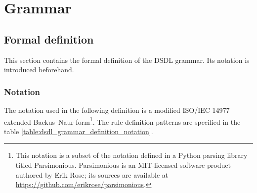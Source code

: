 \section{Grammar}

\subsection{Formal definition}

This section contains the formal definition of the DSDL grammar.
Its notation is introduced beforehand.

\subsubsection{Notation}

The notation used in the following definition is a modified ISO/IEC 14977 extended Backus--Naur
form\footnote{This notation is a subset of the notation defined in a Python parsing library titled Parsimonious.
Parsimonious is an MIT-licensed software product authored by Erik Rose;
its sources are available at \url{https://github.com/erikrose/parsimonious}.}.
The rule definition patterns are specified in the table \ref{table:dsdl_grammar_definition_notation}.

